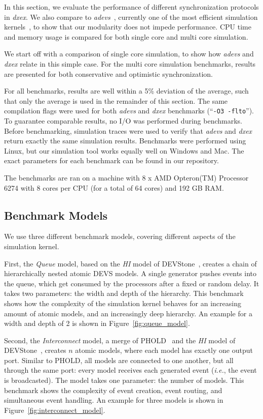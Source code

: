 In this section, we evaluate the performance of different synchronization protocols in \textit{dxex}.
We also compare to \textit{adevs}~\cite{adevs}, currently one of the most efficient simulation kernels~\cite{DEVStoneJournal}, to show that our modularity does not impede performance.
CPU time and memory usage is compared for both single core and multi core simulation.

We start off with a comparison of single core simulation, to show how \textit{adevs} and \textit{dxex} relate in this simple case.
For the multi core simulation benchmarks, results are presented for both conservative and optimistic synchronization.

For all benchmarks, results are well within a 5\% deviation of the average, such that only the average is used in the remainder of this section.
The same compilation flags were used for both \textit{adevs} and \textit{dxex} benchmarks (``\texttt{-O3 -flto}'').
To guarantee comparable results, no I/O was performed during benchmarks.
Before benchmarking, simulation traces were used to verify that \textit{adevs} and \textit{dxex} return exactly the same simulation results.
Benchmarks were performed using Linux, but our simulation tool works equally well on Windows and Mac.
The exact parameters for each benchmark can be found in our repository. 

The benchmarks are ran on a machine with 8 x AMD Opteron(TM) Processor 6274 with 8 cores per CPU (for a total of 64 cores) and 192 GB RAM.

\subsection{Benchmark Models}
We use three different benchmark models, covering different aspects of the simulation kernel.

First, the \textit{Queue} model, based on the \textit{HI} model of DEVStone~\cite{DEVStone}, creates a chain of hierarchically nested atomic \textsf{DEVS} models.
A single generator pushes events into the queue, which get consumed by the processors after a fixed or random delay.
It takes two parameters: the width and depth of the hierarchy.
This benchmark shows how the complexity of the simulation kernel behaves for an increasing amount of atomic models, and an increasingly deep hierarchy.
An example for a width and depth of 2 is shown in Figure~\ref{fig:queue_model}.
	
Second, the \textit{Interconnect} model, a merge of PHOLD~\cite{PHOLD} and the \textit{HI} model of DEVStone~\cite{DEVStone}, creates $n$ atomic models, where each model has exactly one output port.
Similar to PHOLD, all models are connected to one another, but all through the same port: every model receives each generated event (\textit{i.e.}, the event is broadcasted).
The model takes one parameter: the number of models.
This benchmark shows the complexity of event creation, event routing, and simultaneous event handling.
An example for three models is shown in Figure~\ref{fig:interconnect_model}.

